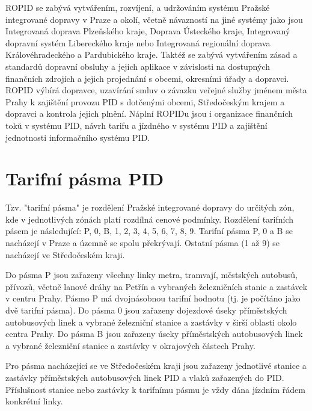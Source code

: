 ROPID se zabývá vytvářením, rozvíjení, a udržováním systému Pražské integrované dopravy v Praze a okolí,
včetně návazností na jiné systémy jako jsou Integrovaná doprava Plzeňského kraje,
Doprava Ústeckého kraje, Integrovaný dopravní systém Libereckého kraje nebo 
Integrovaná regionální doprava Královéhradeckého a Pardubického kraje.
Taktéž se zabývá vytvářením zásad a standardů dopravní obsluhy a jejich aplikace v závislosti
na dostupných finančních zdrojích a jejich projednání s obcemi, okresními úřady a dopravci.
ROPID výbírá dopravce, uzavírání smluv o závazku veřejné služby jménem města Prahy 
k zajištění provozu PID s dotčenými obcemi, Středočeským krajem a dopravci a kontrola jejich plnění.
Náplní ROPIDu jsou i organizace finančních toků v systému PID, návrh tarifu a jízdného v systému PID a
zajištění jednotnosti informačního systému PID.  \cite{wikipedia-ropid}

\section{Tarifní pásma PID}

Tzv. "tarifní pásma" je rozdělení Pražské integrované dopravy do určitých zón, kde v jednotlivých
zónách platí rozdílná cenové podmínky. Rozdělení tarifních pásem je následující:
P, 0, B, 1, 2, 3, 4, 5, 6, 7, 8, 9. Tarifní pásma P, 0 a B se nacházejí v Praze a územně
se spolu překrývají. Ostatní pásma (1 až 9) se nacházejí ve Středočeském kraji.

Do pásma P jsou zařazeny všechny linky metra, tramvají, městských autobusů, přívozů,
včetně lanové dráhy na Petřín a vybraných železničních stanic a zastávek v centru Prahy.
Pásmo P má dvojnásobnou tarifní hodnotu (tj. je počítáno jako dvě tarifní pásma).
Do pásma 0 jsou zařazeny dojezdové úseky příměstských autobusových linek a vybrané
železniční stanice a zastávky v širší oblasti okolo centra Prahy.
Do pásma B jsou zařazeny úseky příměstských autobusových linek a vybrané 
železniční stanice a zastávky v okrajových částech Prahy. 

Pro pásma nacházející se ve Středočeském kraji jsou zařazeny jednotlivé stanice 
a zastávky příměstských autobusových linek PID a vlaků zařazených do PID. 
Příslušnost stanice nebo zastávky k tarifnímu pásmu je vždy dána jízdním řádem konkrétní linky.\cite{pid}

